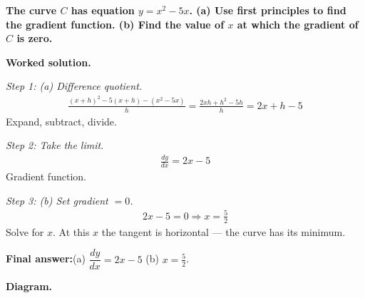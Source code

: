 \documentclass[11pt]{article}
\newcommand{\question}[1]{\par\medskip\noindent\textbf{#1}\par}
\begin{document}
\question{The curve \( C \) has equation \( y = x^2 - 5x \). (a) Use first principles to find the gradient function. (b) Find the value of \( x \) at which the gradient of \( C \) is zero.}

\textbf{Worked solution.}

\textit{Step 1: (a) Difference quotient.}
\[\begin{gathered}
\frac{(x+h)^2 - 5(x+h) - (x^2 - 5x)}{h} = \frac{2xh + h^2 - 5h}{h} = 2x + h - 5
\end{gathered}\]
Expand, subtract, divide.

\textit{Step 2: Take the limit.}
\[\begin{gathered}
\frac{dy}{dx} = 2x - 5
\end{gathered}\]
Gradient function.

\textit{Step 3: (b) Set gradient \( = 0 \).}
\[\begin{gathered}
2x - 5 = 0 \Rightarrow x = \tfrac{5}{2}
\end{gathered}\]
Solve for \( x \). At this \( x \) the tangent is horizontal --- the curve has its minimum.

\begin{answerbox}
\textbf{Final answer:}\quad (a) \(\displaystyle  \dfrac{dy}{dx} = 2x - 5 \) \quad  (b) \(\displaystyle  x = \tfrac{5}{2} \).
\end{answerbox}
\textbf{Diagram.}
\end{document}
